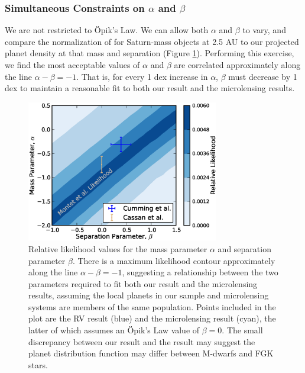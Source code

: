 \subsubsection{Simultaneous Constraints on $\alpha$ and $\beta$}

We are not restricted to \"Opik's Law. We can allow both $\alpha$ and $\beta$ to vary, and compare the normalization of \citet{Cassan12} for Saturn-mass objects at 2.5 AU to our projected planet density at that mass and separation (Figure \ref{alphabeta}). Performing this exercise, we find the most acceptable values of $\alpha$ and $\beta$ are correlated approximately along the line $\alpha - \beta = -1$. That is, for every 1 dex increase in $\alpha$, $\beta$ must decrease by 1 dex to maintain a reasonable fit to both our result and the microlensing results. 

\begin{figure}[htbp]
\centerline{\includegraphics[width=0.75\textwidth]{chapter3/f15.eps}}
\caption[Relative likelihood values for the mass parameter $\alpha$ and separation parameter $\beta$]{Relative likelihood values for the mass parameter $\alpha$ and separation parameter $\beta$. There is a maximum likelihood contour approximately along the line $\alpha - \beta = -1$, suggesting a relationship between the two parameters required to fit both our result and the microlensing results, assuming the local planets in our sample and microlensing systems are members of the same population. Points included in the plot are the \citet{Cumming08} RV result (blue) and the \citet{Cassan12} microlensing result (cyan), the latter of which assumes an \"Opik's Law value of $\beta = 0$. The small discrepancy between our result and the \citet{Cumming08} result may suggest the planet distribution function may differ between M-dwarfs and FGK stars.
}
\label{alphabeta}
\end{figure}

